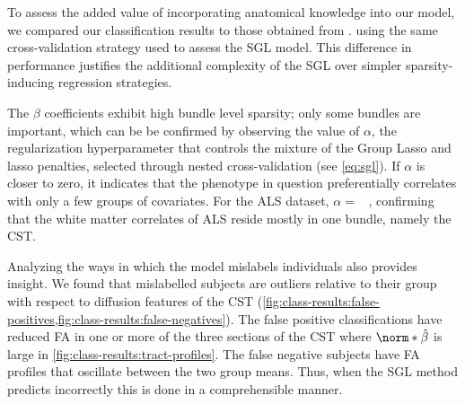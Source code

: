 \documentclass[10pt,letterpaper]{article}
\begin{document}
To assess the added value of incorporating anatomical knowledge into our
model, we compared our classification results to those obtained from
.
using the same cross-validation strategy used to assess the SGL model.
This difference in performance justifies the additional complexity of the SGL
over simpler sparsity-inducing regression strategies.

The $\beta$ coefficients exhibit high bundle level sparsity; only some
bundles are important, which can be be confirmed by observing the value of
$\alpha$, the regularization hyperparameter that controls the mixture of the
Group Lasso and lasso penalties, selected through nested cross-validation
(see \cref{eq:sgl}).
If $\alpha$ is closer to zero, it indicates that the phenotype in question
preferentially correlates with only a few groups of covariates. For the ALS
dataset,  $\alpha = $ \alsLRatio
~,
confirming that the white matter correlates of ALS reside mostly in one
bundle, namely the CST.

Analyzing the ways in which the model mislabels individuals also provides
insight. We found that mislabelled subjects are outliers relative to their
group with respect to diffusion features of the CST
(\cref{fig:class-results:false-positives,fig:class-results:false-negatives}).
The false positive classifications have reduced FA in one or more of the
three sections of the CST where $\norm*{\hat{\beta}}$ is large in
\cref{fig:class-results:tract-profiles}. The false negative subjects have FA
profiles that oscillate between the two group means. Thus, when the SGL
method predicts incorrectly this is done in a comprehensible manner.
\end{document}
